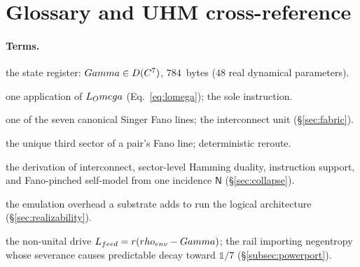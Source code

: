 \section{Glossary and UHM cross-reference}
\label{app:glossary}

\paragraph{Terms.}
\begin{description}[leftmargin=0pt,itemsep=1pt]
  \item[\DM{}] the state register: $Gamma\in D(C^7)$, $784$~bytes ($48$ real dynamical parameters).
  \item[Tick] one application of $L_Omega$ (Eq.~\ref{eq:lomega}); the sole instruction.
  \item[Line-bus] one of the seven canonical Singer Fano lines; the interconnect unit (\S\ref{sec:fabric}).
  \item[Mediator $k^\ast(i,j)$] the unique third sector of a pair's Fano line; deterministic reroute.
  \item[Collapse] the derivation of interconnect, sector-level Hamming duality, instruction support, and Fano-pinched self-model from one incidence $\mathsf{N}$ (\S\ref{sec:collapse}).
  \item[Impedance] the emulation overhead a substrate adds to run the logical architecture (\S\ref{sec:realizability}).
  \item[Power port] the non-unital drive $L_{feed}=r(rho_{env}-Gamma)$; the rail importing negentropy whose severance causes predictable decay toward $\mathbb{1}/7$ (\S\ref{subsec:powerport}).
\end{description}

